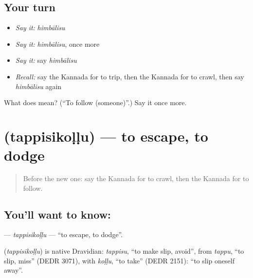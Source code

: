 \subsection*{Your turn}
\begin{itemize}
\raggedright
  \item \emph{Say it:} \emph{himbālisu}
  \item \emph{Say it:} \emph{himbālisu}, once more
  \item \emph{Say it:} say \emph{himbālisu}
  \item \emph{Recall:} say the Kannada for to trip, then the Kannada for to crawl, then say \emph{himbālisu} again
\end{itemize}

\begin{tcolorbox}[breakable,colback=teal!4,colframe=teal!35!black,title={Before you move on}]
What does  mean? (\textquotedblleft{}To follow (someone)\textquotedblright{}.) Say it once more.
\end{tcolorbox}
\section[\texorpdfstring{\kn{ತಪ್ಪಿಸಿಕೊಳ್ಳು} (tappisikoḷḷu)}{ತಪ್ಪಿಸಿಕೊಳ್ಳು (tappisikoḷḷu)}]{ (tappisikoḷḷu) — to escape, to dodge}

\label{lesson:KA-C206-tappisikollu}



\begin{quote}
Before the new one: say the Kannada for to crawl, then the Kannada for to follow.
\end{quote}

\subsection*{You'll want to know: }
\textbf{} — \emph{tappisikoḷḷu} — \textquotedblleft{}to escape, to dodge\textquotedblright{}.

\begin{cousinweb}
\textbf{} (\emph{tappisikoḷḷu}) is native Dravidian: \emph{tappisu}, \textquotedblleft{}to make slip, avoid\textquotedblright{}, from \emph{tappu}, \textquotedblleft{}to slip, miss\textquotedblright{} (DEDR 3071), with \emph{koḷḷu}, \textquotedblleft{}to take\textquotedblright{} (DEDR 2151): \textquotedblleft{}to slip oneself away\textquotedblright{}.
\end{cousinweb}

